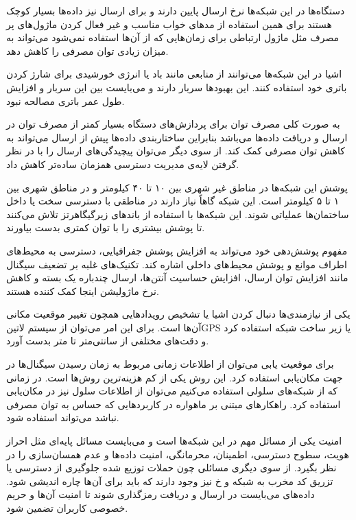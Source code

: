 دستگاه‌ها در این شبکه‌ها نرخ ارسال پایین دارند و برای ارسال نیز داده‌ها بسیار کوچک هستند
برای همین استفاده از مدهای خواب مناسب و غیر فعال کردن ماژول‌های پر مصرف مثل ماژول
ارتباطی برای زمان‌هایی که از آن‌ها استفاده نمی‌شود می‌تواند به میزان زیادی توان مصرفی را کاهش دهد.

اشیا در این شبکه‌ها می‌توانند از منابعی مانند باد یا انرژی خورشیدی برای شارژ کردن باتری خود استفاده کنند.
این بهبودها سربار دارند و می‌بایست بین این سربار و افزایش طول عمر باتری مصالحه نبود.

به صورت کلی مصرف توان برای پردازش‌های دستگاه بسیار کمتر از مصرف توان در ارسال و دریافت داده‌ها می‌باشد
بنابراین ساختاربندی داده‌ها پیش از ارسال می‌تواند به کاهش توان مصرفی کمک کند. از سوی دیگر می‌توان پیچیدگی‌های
ارسال را با در نظر گرفتن لایه‌ی مدیریت دسترسی همزمان ساده‌تر کاهش داد.


پوشش این شبکه‌ها در مناطق غیر شهری بین ۱۰ تا ۴۰ کیلومتر و
در مناطق شهری بین ۱ تا ۵ کیلومتر است.
این شبکه گاهاً نیاز دارند در مناطقی با دسترسی سخت یا داخل ساختمان‌ها
عملیاتی شوند. این شبکه‌ها با استفاده از باندهای زیرگیگاهرتز تلاش می‌کنند تا پوشش بیشتری را با توان کمتری بدست بیاورند.

مفهوم پوشش‌دهی خود می‌تواند به افزایش پوشش جفرافیایی، دسترسی به محیط‌های اطراف موانع و پوشش محیط‌های داخلی اشاره کند.
تکنیک‌های غلبه بر تضعیف سیگنال مانند افزایش توان ارسال، افزایش حساسیت آنتن‌ها، ارسال چندباره یک بسته و کاهش نرخ ماژولیشن اینجا کمک کننده هستند.


یکی از نیازمندی‌ها دنبال کردن اشیا یا تشخیص رویدادهایی همچون تغییر موقعیت مکانی آن‌ها است.
برای این امر می‌توان از سیستم ‌لاتین{GPS} یا زیر ساخت شبکه استفاده کرد و دقت‌های مختلفی
از سانتی‌متر تا متر بدست آورد.

برای موقعیت یابی می‌توان از اطلاعات زمانی مربوط به زمان رسیدن سیگنال‌ها در جهت مکان‌یابی استفاده کرد. این روش
یکی از کم هزینه‌ترین روش‌ها است. در زمانی که از شبکه‌های سلولی استفاده می‌کنیم می‌توان از اطلاعات سلول نیز
در مکان‌یابی استفاده کرد. راهکارهای مبتنی بر ماهواره در کاربردهایی که حساس به توان مصرفی نباشد می‌تواند استفاده شود.


امنیت یکی از مسائل مهم در این شبکه‌ها است و می‌بایست مسائل پایه‌ای
مثل احراز هویت، سطوح دسترسی، اطمینان، محرمانگی، امنیت داده‌ها و عدم همسان‌سازی را در نظر بگیرد.
از سوی دیگری مسائلی چون حملات توزیع شده جلوگیری از دسترسی یا تزریق کد مخرب به شبکه و ‌خ
نیز وجود دارند که باید برای آن‌ها چاره اندیشی شود.
داده‌های می‌بایست در ارسال و دریافت رمزگذاری شوند تا امنیت آن‌ها و حریم خصوصی کاربران تضمین شود.

